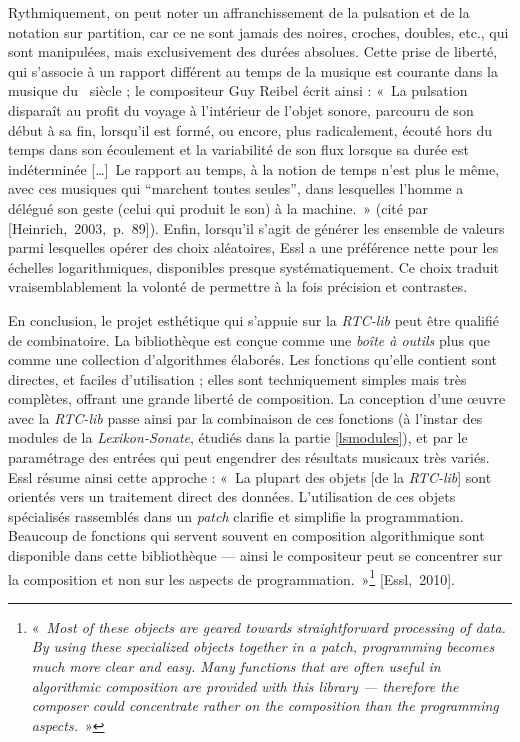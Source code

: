 \documentclass[a4paper,12pt]{article}
\newcommand{\guill}[1]{«~#1~»}
\newcommand{\guilldeux}[1]{“#1”}
\newcommand{\tpp}[0]{[\dots]}
\newcommand{\cicite}[1]{{\footnotesize[#1]}}
\begin{document}
Rythmiquement, on peut noter un affranchissement de la pulsation et de la notation sur partition, car ce ne sont jamais des noires, croches, doubles, etc., qui sont manipulées, mais exclusivement des durées absolues. Cette prise de liberté, qui s'associe à un rapport différent au temps de la musique est courante dans la musique du \XXe~siècle ; le compositeur Guy Reibel écrit ainsi : \guill{La pulsation disparaît au profit du voyage à l'intérieur de l'objet sonore, parcouru de son début à sa fin, lorsqu'il est formé, ou encore, plus radicalement, écouté hors du temps dans son écoulement et la variabilité de son flux lorsque sa durée est indéterminée \tpp~Le rapport au temps, à la notion de temps n'est plus le même, avec ces musiques qui \guilldeux{marchent toutes seules}, dans lesquelles l'homme a délégué son geste (celui qui produit le son) à la machine.} (cité par \cicite{Heinrich,~2003,~p.~89}). Enfin, lorsqu'il s'agit de générer les ensemble de valeurs parmi lesquelles opérer des choix aléatoires, Essl a une préférence nette pour les échelles logarithmiques, disponibles presque systématiquement. Ce choix traduit vraisemblablement la volonté de permettre à la fois précision et contrastes. %

En conclusion, le projet esthétique qui s'appuie sur la \emph{RTC-lib} peut être qualifié de combinatoire. La bibliothèque est conçue comme une \emph{boîte à outils} plus que comme une collection d'algorithmes élaborés. Les fonctions qu'elle contient sont directes, et faciles d'utilisation ; elles sont techniquement simples mais très complètes, offrant une grande liberté de composition. La conception d'une œuvre avec la \emph{RTC-lib} passe ainsi par la combinaison de ces fonctions (à l'instar des modules de la \emph{Lexikon-Sonate}, étudiés dans la partie \ref{lsmodules}), et par le paramétrage des entrées qui peut engendrer des résultats musicaux très variés. Essl résume ainsi cette approche : \guill{La plupart des objets [de la \emph{RTC-lib}] sont orientés vers un traitement direct des données. L'utilisation de ces objets spécialisés rassemblés dans un \emph{patch} clarifie et simplifie la programmation. Beaucoup de fonctions qui servent souvent en composition algorithmique sont disponible dans cette bibliothèque --- ainsi le compositeur peut se concentrer sur la composition et non sur les aspects de programmation.}\footnote{\guill{\emph{Most of these objects are geared towards straightforward processing of data. By using these specialized objects together in a patch, programming becomes much more clear and easy. Many functions that are often useful in algorithmic composition are provided with this library --- therefore the composer could concentrate rather on the composition than the programming aspects.}}} \cicite{Essl,~2010}.
\end{document}
